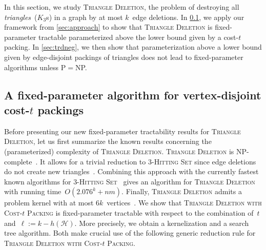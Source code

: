 \documentclass[envcountsame,numbook,smallextended]{svjour3}
\numberwithin{equation}{section}
\numberwithin{figure}{section}
\newcommand{\packing}{\ensuremath{\mathcal H}}
\newcommand{\TAGP}{\textsc{Triangle Deletion with  Cost-$t$ Packing}}
\begin{document}
In this section, we study \textsc{Triangle Deletion}, the problem of destroying all \emph{triangles}~($K_3$s) in a graph by at most $k$~edge deletions.  In \cref{sec:trdpos}, we apply our framework from \cref{sec:approach} to show that \textsc{Triangle Deletion} is fixed-parameter tractable parameterized above the lower bound given by a cost-\(t\) packing.  In \cref{sec:trdneg}, we then show that parameterization above a lower bound given by edge-disjoint packings of triangles does not lead to fixed-parameter algorithms unless P\({}={}\)NP.

\subsection{A fixed-parameter algorithm  for vertex-disjoint cost-\(t\) packings}\label{sec:trdpos}
Before presenting our new fixed-parameter tractability results for \textsc{Triangle Deletion}, let us first summarize the known results concerning the (parameterized)
complexity of \textsc{Triangle Deletion}.
\textsc{Triangle Deletion} is NP-complete~\cite{Yan81}. It allows for a trivial reduction to \textsc{3-Hitting Set} since edge deletions do not create new triangles~\cite{GGHN04}. Combining this approach with the currently fastest known algorithms for \textsc{3-Hitting Set}~\cite{wahl07,Bev14} gives an algorithm for \textsc{Triangle Deletion} with running time~$O(2.076^k+nm)$. Finally, \textsc{Triangle Deletion} admits a problem kernel with at most $6k$~vertices~\cite{BKM09}.
We show that \TAGP{} is fixed-parameter tractable with respect to
the combination of~$t$ and~$\ell:=k-h(\packing)$.
More precisely, we obtain a kernelization and a search tree algorithm.
Both make crucial use of the following generic reduction rule for \TAGP.
\end{document}
